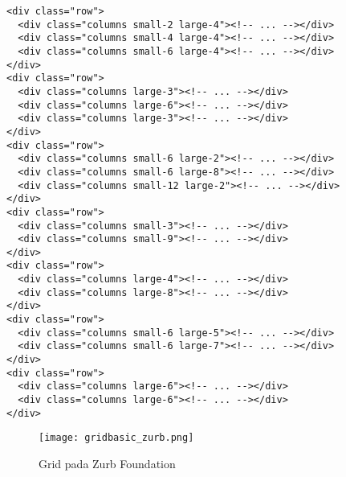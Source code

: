 \begin{lstlisting}[frame=single] 
<div class="row">
  <div class="columns small-2 large-4"><!-- ... --></div>
  <div class="columns small-4 large-4"><!-- ... --></div>
  <div class="columns small-6 large-4"><!-- ... --></div>
</div>
<div class="row">
  <div class="columns large-3"><!-- ... --></div>
  <div class="columns large-6"><!-- ... --></div>
  <div class="columns large-3"><!-- ... --></div>
</div>
<div class="row">
  <div class="columns small-6 large-2"><!-- ... --></div>
  <div class="columns small-6 large-8"><!-- ... --></div>
  <div class="columns small-12 large-2"><!-- ... --></div>
</div>
<div class="row">
  <div class="columns small-3"><!-- ... --></div>
  <div class="columns small-9"><!-- ... --></div>
</div>
<div class="row">
  <div class="columns large-4"><!-- ... --></div>
  <div class="columns large-8"><!-- ... --></div>
</div>
<div class="row">
  <div class="columns small-6 large-5"><!-- ... --></div>
  <div class="columns small-6 large-7"><!-- ... --></div>
</div>
<div class="row">
  <div class="columns large-6"><!-- ... --></div>
  <div class="columns large-6"><!-- ... --></div>
</div>
\end{lstlisting}

\begin{figure} [H]
	\centering  
	\texttt{[image: gridbasic\_zurb.png]}  
	\caption{Grid pada Zurb Foundation}	 
\end{figure}

